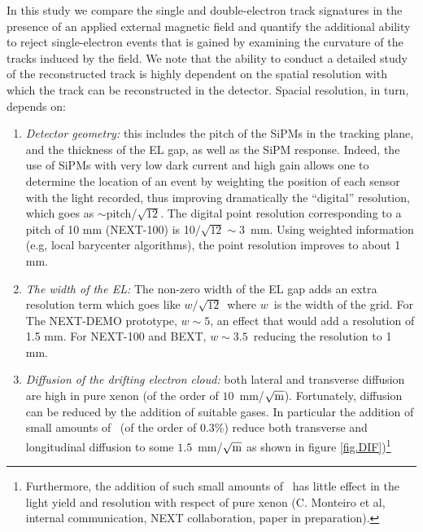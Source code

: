 \documentclass{JINST}
\begin{document}
In this study we compare the single and double-electron track signatures in the presence of an applied external magnetic field and quantify the additional ability to reject single-electron events that is gained by examining the curvature of the tracks induced by the field.  We note that the ability to conduct a detailed study of the reconstructed track is highly dependent on the spatial resolution with which the track can be reconstructed in the detector. Spacial resolution, in turn, depends on:
\begin{enumerate}
\item {\em Detector geometry:} this includes the pitch of the SiPMs in the tracking plane, and the thickness of the EL gap, as well as the SiPM response. Indeed, the use of SiPMs with very low dark current and high gain allows one to determine the location of an event by weighting the position of each sensor with the light recorded, thus improving dramatically the ``digital'' resolution, which goes as $\sim$pitch/$\sqrt{12}$. The digital point resolution corresponding to a pitch of 10 mm (NEXT-100) is 10$/\sqrt{12} \sim 3$~mm. Using weighted information (e.g, local barycenter algorithms), the point resolution improves to about 1 mm. 
\item {\em The width of the EL:}
The non-zero width of the EL gap adds an extra resolution term which goes like $w/\sqrt{12}$~where $w$~is the width of the grid. For The NEXT-DEMO prototype, $w\sim 5$, an effect that would add a resolution of 1.5 mm. For NEXT-100 and BEXT, $w\sim 3.5$~reducing the resolution to 1 mm. 

\item {\em Diffusion of the drifting electron cloud:}  both lateral and transverse diffusion are high in pure xenon (of the order of $10$~mm/$\sqrt{\rm{m}}$). Fortunately, diffusion can be reduced by the addition of suitable gases. In particular the addition of small amounts of \COT\ (of the order of 0.3\%) reduce both transverse and longitudinal diffusion to some $1.5$~mm/$\sqrt{\rm{m}}$ as shown in figure \ref{fig.DIF})\footnote{Furthermore, the addition of such small amounts of \COT\ has little effect in the light yield and resolution with respect of pure xenon (C. Monteiro et al, internal communication, NEXT collaboration, paper in preparation).}
\end{enumerate}
\end{document}
